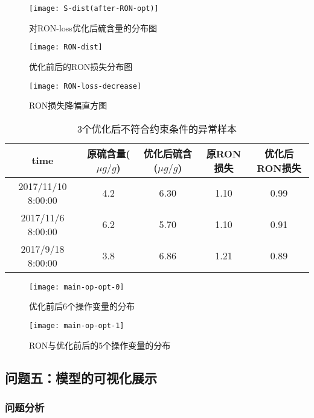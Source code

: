 \documentclass[bwprint]{gmcmthesis}
\begin{document}
\begin{figure}[htb]
	\centering
	\texttt{[image: S-dist(after-RON-opt)]}
	\caption{对RON-loss优化后硫含量的分布图}
\end{figure}

\begin{figure}[htb]
	\centering
	\texttt{[image: RON-dist]}
	\caption{优化前后的RON损失分布图}
\end{figure}




\begin{figure}[htb]
	\centering
	\texttt{[image: RON-loss-decrease]}
	\caption{RON损失降幅直方图}
\end{figure}

\begin{table}[htb]
	\caption{3个优化后不符合约束条件的异常样本}\label{tab:004} \centering
	\begin{tabular}{ccccc}
		\toprule[1.5pt]
	 time &  原硫含量($\mu g/g$) &  优化后硫含($\mu g/g$) &  原RON损失 &  优化后RON损失 \\
		\midrule[1pt]
2017/11/10 8:00:00 &              4.2 &               6.30 &    1.10 &      0.99 \\
2017/11/6 8:00:00 &              6.2 &               5.70 &    1.10 &      0.91 \\
2017/9/18 8:00:00 &              3.8 &               6.86 &    1.21 &      0.89 \\  
		\bottomrule[1.5pt]
	\end{tabular}
\end{table}

\begin{figure}[htb]
	\centering
	\texttt{[image: main-op-opt-0]}
	\caption{优化前后6个操作变量的分布}
\end{figure}

\begin{figure}[htb]
	\centering
	\texttt{[image: main-op-opt-1]}
	\caption{RON与优化前后的5个操作变量的分布}
\end{figure}

\FloatBarrier
\subsection{问题五：模型的可视化展示}

\FloatBarrier
\subsubsection{问题分析}
\end{document}

